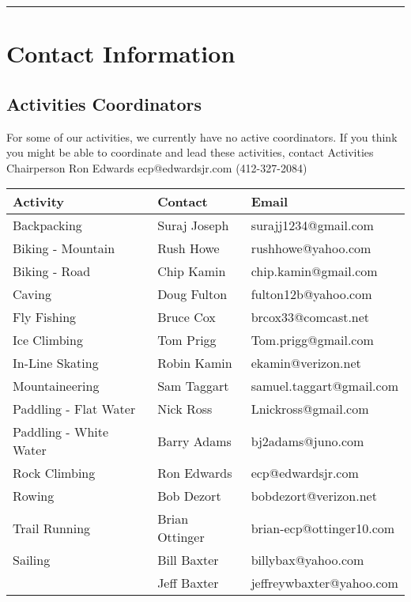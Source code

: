 \documentclass[10pt,a4paper]{article}
\begin{document}
\hrule

\clearpage
\pagebreak


\appendix

\section{Contact Information}

\subsection{Activities Coordinators}
For some of our activities, we currently have no active coordinators. If you think you might be able to coordinate
and lead these activities, contact Activities Chairperson Ron Edwards ecp@edwardsjr.com (412-327-2084)


\begin{center}
    \begin{tabular}{ | l | l | l | }
    \hline
    \textbf{Activity} & \textbf{Contact} & \textbf{Email} \\\hline
	Backpacking & Suraj Joseph & surajj1234@gmail.com \\ \hline
	Biking - Mountain & Rush Howe & rushhowe@yahoo.com \\ \hline
	Biking - Road & Chip Kamin & chip.kamin@gmail.com \\ \hline
    Caving  & Doug Fulton & fulton12b@yahoo.com\\ \hline
    Fly Fishing & Bruce Cox & brcox33@comcast.net\\ \hline
    Ice Climbing & Tom Prigg & Tom.prigg@gmail.com\\ \hline
    In-Line Skating & Robin Kamin & ekamin@verizon.net\\ \hline
    Mountaineering & Sam Taggart & samuel.taggart@gmail.com\\ \hline
    Paddling - Flat Water & Nick Ross & Lnickross@gmail.com\\ \hline
    Paddling - White Water & Barry Adams & bj2adams@juno.com\\ \hline
    Rock Climbing & Ron Edwards & ecp@edwardsjr.com\\ \hline
    Rowing & Bob Dezort & bobdezort@verizon.net\\ \hline
    Trail Running & Brian Ottinger &  brian-ecp@ottinger10.com\\ \hline
    Sailing & Bill Baxter & billybax@yahoo.com\\ \hline
		   &  Jeff Baxter& jeffreywbaxter@yahoo.com\\ \hline

\end{tabular}
\end{center}
\end{document}
